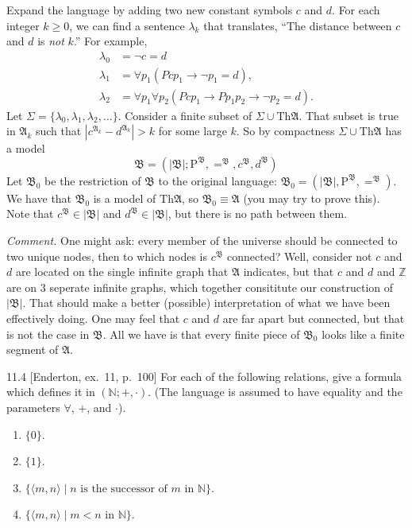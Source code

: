 Expand the language by adding two new constant symbols $c$ and $d$. For each integer $k\geq 0$, we can find a sentence $\lambda_k$ that translates, ``The distance between $c$ and $d$ is \textit{not} $k$.'' For example,
\begin{align*}
  \lambda_0 & =\neg c=d                                                \\
  \lambda_1 & =\forall p_1(Pcp_1\to\neg p_1=d),                        \\
  \lambda_2 & =\forall p_1\forall p_2(Pcp_1\to Pp_1p_2\to \neg p_2=d).
\end{align*}
Let $\Sigma=\{\lambda_0,\lambda_1,\lambda_2,\dots\}.$ Consider a finite subset of $\Sigma\cup \mathrm{Th}\mathfrak{A}$. That subset is true in $\mathfrak{A}_k$ such that $|c^{\mathfrak{A}_k}-d^{\mathfrak{A}_k}|>k$ for some large $k$. So by compactness $\Sigma\cup \mathrm{Th}\mathfrak{A}$ has a model
\[
  \mathfrak{B}=(|\mathfrak{B}|;\mathrm{P}^{\mathfrak{B}},=^{\mathfrak{B}},c^{\mathfrak{B}},d^{\mathfrak{B}})
\]
Let $\mathfrak{B}_0$ be the restriction of $\mathfrak{B}$ to the original language: $\mathfrak{B}_0=(|\mathfrak{B}|,\mathrm{P}^{\mathfrak{B}},=^{\mathfrak{B}})$. We have that $\mathfrak B_0$ is a model of $\mathrm{Th}\mathfrak A$, so $\mathfrak{B}_0\equiv \mathfrak{A}$ (you may try to prove this). Note that $c^{\mathfrak{B}}\in|\mathfrak{B}|$ and $d^{\mathfrak{B}}\in|\mathfrak{B}|$, but there is no path between them.

\textit{Comment.} One might ask: every member of the universe should be connected to two unique nodes, then to which nodes is $c^{\mathfrak{B}}$ connected? Well, consider not $c$ and $d$ are located on the single infinite graph that $\mathfrak{A}$ indicates, but that $c$ and $d$ and $\mathbb{Z}$ are on 3 seperate infinite graphs, which together consititute our construction of $|\mathfrak{B}|$. That should make a better (possible) interpretation of what we have been effectively doing. One may feel that $c$ and $d$ are far apart but connected, but that is not the case in $\mathfrak{B}$. All we have is that every finite piece of $\mathfrak{B}_0$ looks like a finite segment of $\mathfrak{A}$.

\begin{exercise}{11.4}
  [Enderton, ex.~11, p.~100]
  For each of the following relations, give a formula which defines it in \((\mathbb{N}; +, \cdot)\). (The language is assumed to have equality and the parameters \(\forall\), \(+\), and \(\cdot\)).
  \begin{enumerate}
    \item \(\{0\}\).
    \item \(\{1\}\).
    \item \(\{ \langle m, n \rangle \mid n \text{ is the successor of } m \text{ in } \mathbb{N} \}\).
    \item \(\{ \langle m, n \rangle \mid m < n \text{ in } \mathbb{N} \}\).\qedhere
  \end{enumerate}
\end{exercise}


